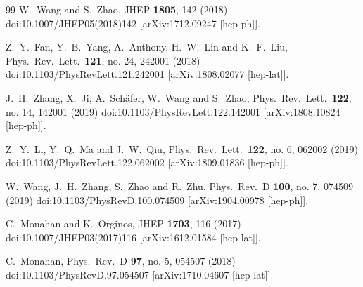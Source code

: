 \begin{thebibliography}{99}
  W.~Wang and S.~Zhao,
  JHEP {\bf 1805}, 142 (2018)
  doi:10.1007/JHEP05(2018)142
  [arXiv:1712.09247 [hep-ph]].


  Z.~Y.~Fan, Y.~B.~Yang, A.~Anthony, H.~W.~Lin and K.~F.~Liu,
  Phys.\ Rev.\ Lett.\  {\bf 121}, no. 24, 242001 (2018)
  doi:10.1103/PhysRevLett.121.242001
  [arXiv:1808.02077 [hep-lat]].


  J.~H.~Zhang, X.~Ji, A.~Sch\"afer, W.~Wang and S.~Zhao,
  Phys.\ Rev.\ Lett.\  {\bf 122}, no. 14, 142001 (2019)
  doi:10.1103/PhysRevLett.122.142001
  [arXiv:1808.10824 [hep-ph]].


  Z.~Y.~Li, Y.~Q.~Ma and J.~W.~Qiu,
  Phys.\ Rev.\ Lett.\  {\bf 122}, no. 6, 062002 (2019)
  doi:10.1103/PhysRevLett.122.062002
  [arXiv:1809.01836 [hep-ph]].


  W.~Wang, J.~H.~Zhang, S.~Zhao and R.~Zhu,
  Phys.\ Rev.\ D {\bf 100}, no. 7, 074509 (2019)
  doi:10.1103/PhysRevD.100.074509
  [arXiv:1904.00978 [hep-ph]].


  C.~Monahan and K.~Orginos,
  JHEP {\bf 1703}, 116 (2017)
  doi:10.1007/JHEP03(2017)116
  [arXiv:1612.01584 [hep-lat]].


  C.~Monahan,
  Phys.\ Rev.\ D {\bf 97}, no. 5, 054507 (2018)
  doi:10.1103/PhysRevD.97.054507
  [arXiv:1710.04607 [hep-lat]].



\end{thebibliography}
